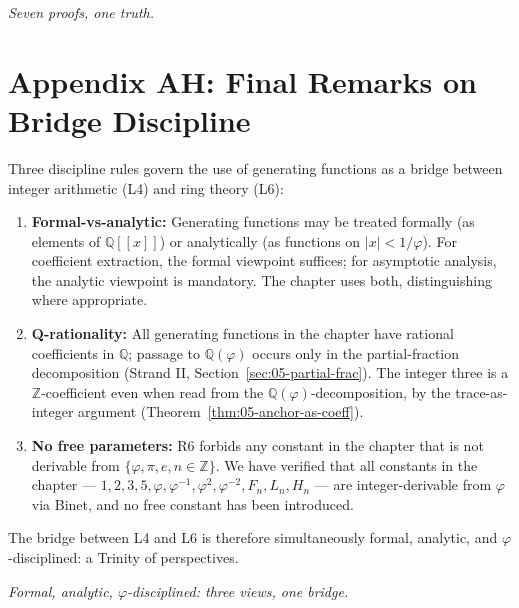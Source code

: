 \bigskip
\centerline{\textit{Seven proofs, one truth.}}

\section*{Appendix AH: Final Remarks on Bridge Discipline}
\label{fa_05:sec:05-app-AH}

Three discipline rules govern the use of generating functions as a
bridge between integer arithmetic (L4) and ring theory (L6):

\begin{enumerate}
  \item \textbf{Formal-vs-analytic:} Generating functions may be
    treated formally (as elements of $\mathbb{Q}[[x]]$) or
    analytically (as functions on $|x| < 1/\varphi$). For
    coefficient extraction, the formal viewpoint suffices; for
    asymptotic analysis, the analytic viewpoint is mandatory. The
    chapter uses both, distinguishing where appropriate.
  \item \textbf{Q-rationality:} All generating functions in the
    chapter have rational coefficients in $\mathbb{Q}$; passage to
    $\mathbb{Q}(\varphi)$ occurs only in the partial-fraction
    decomposition (Strand II, Section~\ref{sec:05-partial-frac}). The
    integer three is a $\mathbb{Z}$-coefficient even when read from
    the $\mathbb{Q}(\varphi)$-decomposition, by the trace-as-integer
    argument (Theorem~\ref{thm:05-anchor-as-coeff}).
  \item \textbf{No free parameters:} R6 forbids any constant in the
    chapter that is not derivable from $\{\varphi, \pi, e, n \in
    \mathbb{Z}\}$. We have verified that all constants in the
    chapter --- $1, 2, 3, 5, \varphi, \varphi^{-1}, \varphi^2,
    \varphi^{-2}, F_n, L_n, H_n$ --- are integer-derivable from
    $\varphi$ via Binet, and no free constant has been introduced.
\end{enumerate}

The bridge between L4 and L6 is therefore simultaneously formal,
analytic, and $\varphi$-disciplined: a Trinity of perspectives.

\bigskip

\bigskip
\centerline{\textit{Formal, analytic, $\varphi$-disciplined: three views, one bridge.}}
\bigskip

